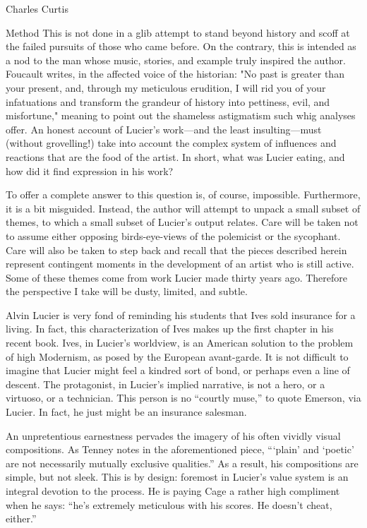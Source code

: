 \documentclass[a4paper,10pt]{report}
\numberwithin{equation}{section}
\begin{document}
\begin{chapter}{Charles Curtis}
\begin{section}{Method}
This is not done in a glib attempt to stand beyond history and scoff at the failed pursuits of those who came before. On the contrary, this is intended as a nod to the man whose music, stories, and example truly inspired the author. Foucault writes, in the affected voice of the historian: "No past is greater than your present, and, through my meticulous erudition, I will rid you of your infatuations and transform the grandeur of history into pettiness, evil, and misfortune,"\cite[p.~91]{Foucalt1984} meaning to point out the shameless astigmatism such whig analyses offer. An honest account of Lucier's work---and the least insulting---must (without grovelling!) take into account the complex system of influences and reactions that are the food of the artist. In short, what was Lucier eating, and how did it find expression in his work?

To offer a complete answer to this question is, of course, impossible. Furthermore, it is a bit misguided. Instead, the author will attempt to unpack a small subset of themes, to which a small subset of Lucier's output relates. Care will be taken not to assume either opposing birds-eye-views of the polemicist or the sycophant. Care will also be taken to step back and recall that the pieces described herein represent contingent moments in the development of an artist who is still active. Some of these themes come from work Lucier made thirty years ago. Therefore the perspective I take will be dusty, limited, and subtle. 
\end{section}
\begin{section}{Alvin}
 Lucier is very fond of reminding his students that Ives sold insurance for a living. In fact, this characterization of Ives makes up the first chapter in his recent book. Ives, in Lucier's worldview, is an American solution to the problem of high Modernism, as posed by the European avant-garde.\cite[p.~3]{lucier2012} It is not difficult to imagine that Lucier might feel a kindred sort of bond, or perhaps even a line of descent. The protagonist, in Lucier's implied narrative, is not a hero, or a virtuoso, or a technician. This person is no ``courtly muse,'' to quote Emerson, via Lucier. In fact, he just might be an insurance salesman.\cite[p.~3]{lucier2012} 

An unpretentious earnestness pervades the imagery of his often vividly visual compositions. As Tenney notes in the aforementioned piece, ```plain' and `poetic' are not necessarily mutually exclusive qualities.''\cite[p.~16]{lucier1995} As a result, his compositions are simple, but not sleek. This is by design: foremost in Lucier's value system is an integral devotion to the process. He is paying Cage a rather high compliment when he says: ``he's extremely meticulous with his scores. He doesn't cheat, either.''\cite[p.~11]{lucier2012} 


\end{section}
\end{chapter}
\end{document}
